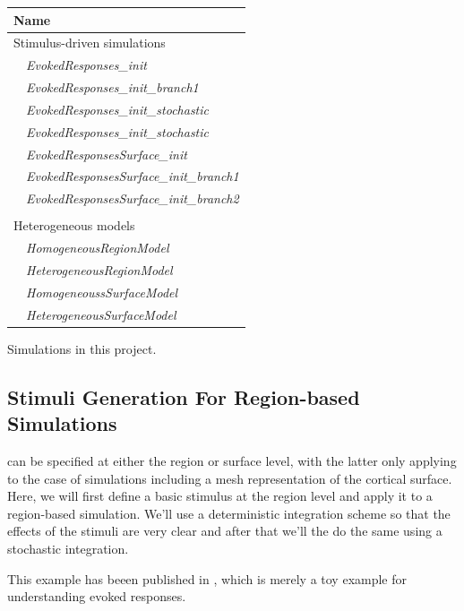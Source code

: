 \documentclass{tufte-handout}
\begin{document}
\begin{margintable}
  \centering
  \selectfont
  \begin{tabular}{l}
    \toprule
    Name \\
    \midrule
    \multicolumn{1}{l}{Stimulus-driven simulations}\\
    $\quad$\textit{EvokedResponses\_init} \\
    $\quad$\textit{EvokedResponses\_init\_branch1}  \\ 
    $\quad$\textit{EvokedResponses\_init\_stochastic}  \\ 
    $\quad$\textit{EvokedResponses\_init\_stochastic}  \\ 
     $\quad$\textit{EvokedResponsesSurface\_init} \\
    $\quad$\textit{EvokedResponsesSurface\_init\_branch1} \\
     $\quad$\textit{EvokedResponsesSurface\_init\_branch2} \\
     \\
         \multicolumn{1}{l}{Heterogeneous models}\\
     $\quad$\textit{HomogeneousRegionModel}\\
     $\quad$\textit{HeterogeneousRegionModel} \\
     $\quad$\textit{HomogeneoussSurfaceModel}\\
     $\quad$\textit{HeterogeneousSurfaceModel}\\
    \bottomrule
  \end{tabular}
  \caption{Simulations in this project.}
  \label{tab:normaltab}
\end{margintable}

\subsection{Stimuli Generation For Region-based Simulations}\label{sec:region_stim}

 can be specified at either the region or surface level,
with the latter only applying to the case of simulations including a mesh
representation of the cortical surface. Here, we will first define a basic
stimulus at the region level and apply it to a region-based simulation. We'll
use a deterministic integration scheme so that the effects of the stimuli are
very clear and after that  we'll the do the same using a stochastic
integration. 

This example has beeen published in \citep{Sanz-Leon_2013}, which is merely a
toy example for understanding evoked responses.
\end{document}
